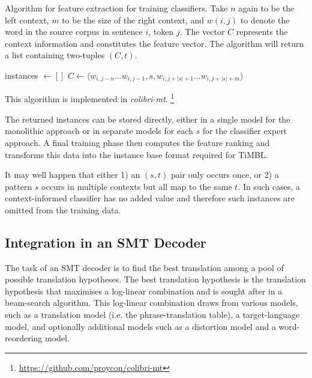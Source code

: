 \documentclass[smallextended]{svjour3}       %
\theoremstyle{break}
\begin{document}
\begin{algorithm}
\caption{Algorithm for feature extraction for training classifiers.  Take $n$
again to be the left context, $m$ to be the size of the right context, and
$w{(i,j)}$ to denote the word in the source corpus in sentence $i$, token $j$.
The vector $C$ represents the context information and constitutes the feature
vector.  The algorithm will return a list containing two-tuples $(C,t)$.  }
\label{alg:featureextract}
\begin{algorithmic}
\State instances $\gets []$
        \State $C \gets \langle w_{i,j-n} \ldots w_{i,j-1}, s, w_{i,j+|s|+1} \ldots w_{i,j+|s|+m} \rangle$
        \State {} 
      \EndFor
  \EndFor
\EndFor \\
\end{algorithmic}
\end{algorithm}
    
\noindent
This algorithm is implemented in \emph{colibri-mt}.
\footnote{\url{https://github.com/proycon/colibri-mt}}

The returned instances can be stored directly, either in a single model for the
monolithic approach or in separate models for each $s$ for the classifier
expert approach. A final training phase then computes the feature ranking and
transforms this data into the instance base format required for TiMBL.

It may well happen that either 1) an $(s,t)$ pair only occurs once, or
2) a pattern $s$ occurs in multiple contexts but all map to the same
$t$. In such cases, a context-informed classifier has no added value
and therefore such instances are omitted from the training data.

\subsection{Integration in an SMT Decoder}
\label{sec:smtintegration}

The task of an SMT decoder is to find the best translation among a pool
of possible translation hypotheses. The best translation hypothesis is the
translation hypothesis that maximises a log-linear combination and is sought
after in a beam-search algorithm. This log-linear combination draws from
various models, such as a translation model (i.e. the phrase-translation
table), a target-language model, and optionally additional models such as a
distortion model and a word-reordering model. 
\end{document}
